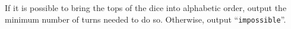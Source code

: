 
    If it is possible to bring the tops of the dice into alphabetic order,
    output the minimum number of turns needed to do so.
    Otherwise, output ``\texttt{impossible}''.
